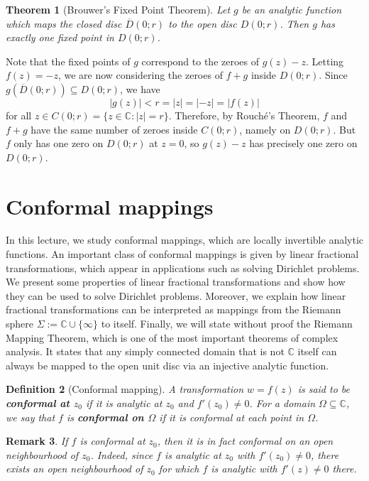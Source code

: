 \documentclass[10pt]{article}
\makeatletter
\newcommand{\C}{\mathbb{C}}
\theoremstyle{newstyle}
\newtheorem{thm}{Theorem}[section]
\newtheorem{remark}[thm]{Remark}
\newtheorem{defn}[thm]{Definition}
\newenvironment{pf}[1][\proofname]{\par
  \pushQED{\qed}%
  \normalfont \topsep0\p@\relax
  \trivlist
  \item[\hskip\labelsep\scshape
  #1\@addpunct{.}]\ignorespaces
}{%
  \popQED\endtrivlist\@endpefalse
}
\makeatother
\begin{document}
\begin{thm}[Brouwer's Fixed Point Theorem]
Let $g$ be an analytic function which maps the closed disc $\overline{D}(0; r)$ to the open disc 
$D(0; r)$. Then $g$ has exactly one fixed point in $D(0; r)$. 
\end{thm}
\begin{pf}
Note that the fixed points of $g$ correspond to the zeroes of $g(z) - z$. Letting $f(z) = -z$, we 
are now considering the zeroes of $f + g$ inside $D(0; r)$. Since $g(\overline{D}(0; r)) \subseteq 
D(0; r)$, we have 
\[ |g(z)| < r = |z| = |{-}z| = |f(z)| \]
for all $z \in C(0; r) = \{z \in \C : |z| = r\}$. Therefore, by Rouch\'e's Theorem, $f$ and 
$f + g$ have the same number of zeroes inside $C(0; r)$, namely on $D(0; r)$. But $f$ only 
has one zero on $D(0; r)$ at $z = 0$, so $g(z) - z$ has precisely one zero on $D(0; r)$. 
\end{pf}

\newpage 
\section{Conformal mappings}

In this lecture, we study conformal mappings, which are locally invertible analytic functions. 
An important class of conformal mappings is given by linear fractional transformations, 
which appear in applications such as solving Dirichlet problems. We present some properties of 
linear fractional transformations and show how they can be used to solve Dirichlet problems. 
Moreover, we explain how linear fractional transformations can be interpreted as mappings 
from the Riemann sphere $\Sigma := \C \cup \{\infty\}$ to itself. Finally, we will state 
without proof the Riemann Mapping Theorem, which is one of the most important theorems of 
complex analysis. It states that any simply connected domain that is not $\C$ itself can 
always be mapped to the open unit disc via an injective analytic function. 

\begin{defn}[Conformal mapping]
A transformation $w = f(z)$ is said to be {\bf conformal at $z_0$} if it is analytic at $z_0$ 
and $f'(z_0) \neq 0$. For a domain $\Omega \subseteq \C$, we say that $f$ is {\bf conformal 
on $\Omega$} if it is conformal at each point in $\Omega$.
\end{defn}

\begin{remark}
If $f$ is conformal at $z_0$, then it is in fact conformal on an open neighbourhood of $z_0$. 
Indeed, since $f$ is analytic at $z_0$ with $f'(z_0) \neq 0$, there exists an open neighbourhood 
of $z_0$ for which $f$ is analytic with $f'(z) \neq 0$ there. 
\end{remark}
\end{document}

